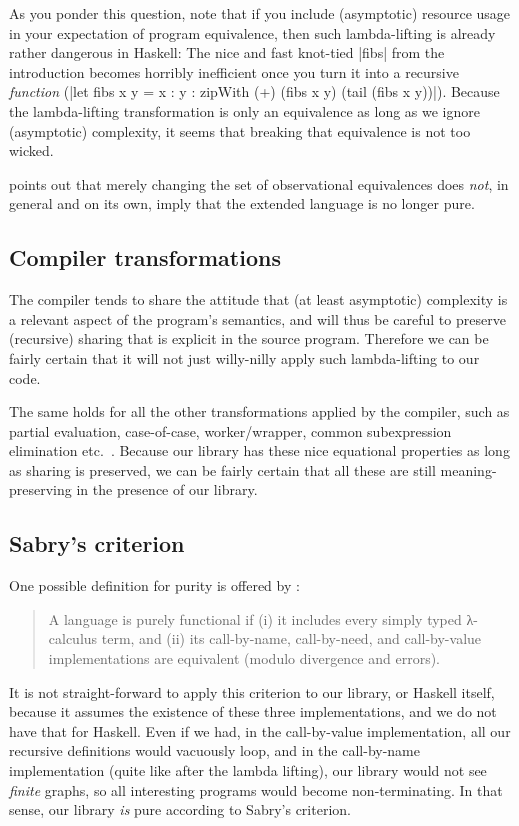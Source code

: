 \documentclass[manuscript,review,screen,acmsmall]{acmart}
\begin{document}
As you ponder this question, note that if you include (asymptotic) resource usage in your expectation of program equivalence, then such lambda-lifting is already rather dangerous in Haskell: The nice and fast knot-tied |fibs| from the introduction becomes horribly inefficient once you turn it into a recursive \emph{function} (|let fibs x y = x : y  : zipWith (+) (fibs x y) (tail (fibs x y))|). Because the lambda-lifting transformation is only an equivalence as long as we ignore (asymptotic) complexity, it seems that breaking that equivalence is not too wicked.

 points out that merely changing the set of observational equivalences does \emph{not}, in general and on its own, imply that the extended language is no longer pure.

\subsection{Compiler transformations}\label{sec:comptrans}

The compiler tends to share the attitude that (at least asymptotic) complexity is a relevant aspect of the program's semantics, and will thus be careful to preserve (recursive) sharing that is explicit in the source program. Therefore we can be fairly certain that it will not just willy-nilly apply such lambda-lifting to our code.

The same holds for all the other transformations applied by the compiler, such as partial evaluation, case-of-case, worker/wrapper, common subexpression elimination etc.\ \citep{optimiser}. Because our library has these nice equational properties as long as sharing is preserved, we can be fairly certain that all these are still meaning-preserving in the presence of our library.

\subsection{Sabry's criterion}

One possible definition for purity is offered by \citet{sabry}:
\begin{quote}
A language is purely functional if (i) it includes every simply typed λ-calculus term, and
(ii) its call-by-name, call-by-need, and call-by-value implementations are equivalent (modulo
divergence and errors).
\end{quote}

It is not straight-forward to apply this criterion to our library, or Haskell itself, because it assumes the existence of these three implementations, and we do not have that for Haskell. Even if we had, in the call-by-value implementation, all our recursive definitions would vacuously loop, and in the call-by-name implementation (quite like after the lambda lifting), our library would not see \emph{finite} graphs, so all interesting programs would become non-terminating. In that sense, our library \emph{is} pure according to Sabry’s criterion.
\end{document}
